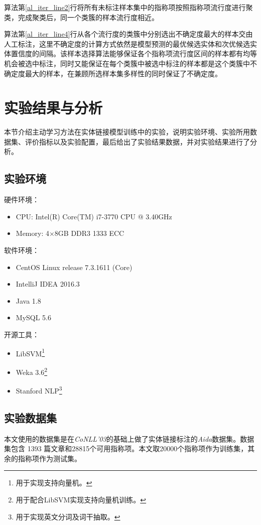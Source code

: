 算法第\ref{al_iter_line2}行将所有未标注样本集中的指称项按照指称项流行度进行聚类，完成聚类后，同一个类簇的样本流行度相近。

算法第\ref{al_iter_line4}行从各个流行度的类簇中分别选出不确定度最大的样本交由人工标注，这里不确定度的计算方式依然是模型预测的最优候选实体和次优候选实体置信度的间隔。该样本选择算法能够保证各个指称项流行度区间的样本都有均等机会被选中标注，同时又能保证在每个类簇中被选中标注的样本都是这个类簇中不确定度最大的样本，在兼顾所选样本集多样性的同时保证了不确定度。

\section{实验结果与分析}
本节介绍主动学习方法在实体链接模型训练中的实验，说明实验环境、实验所用数据集、评价指标以及实验配置，最后给出了实验结果数据，并对实验结果进行了分析。

\subsection{实验环境}\label{section:dev_env}
硬件环境：

\begin{itemize}
	\item CPU: Intel(R) Core(TM) i7-3770 CPU @ 3.40GHz
	\item Memory: 4$\times$8GB DDR3 1333 ECC
\end{itemize}

软件环境：

\begin{itemize}
	\item CentOS Linux release 7.3.1611 (Core)
	\item IntelliJ IDEA 2016.3
	\item Java 1.8
	\item MySQL 5.6
\end{itemize}

开源工具：

\begin{itemize}
	\item LibSVM\footnote{用于实现支持向量机。}
	\item Weka 3.6\footnote{用于配合LibSVM实现支持向量机训练。}
	\item Stanford NLP\footnote{用于实现英文分词及词干抽取。}
\end{itemize}

\subsection{实验数据集}\label{section:dataset}
本文使用的数据集是在\textit{CoNLL'03}的基础上做了实体链接标注的\textit{Aida}数据集。数据集包含 1393 篇文章和28815个可用指称项。本文取20000个指称项作为训练集，其余的指称项作为测试集。

